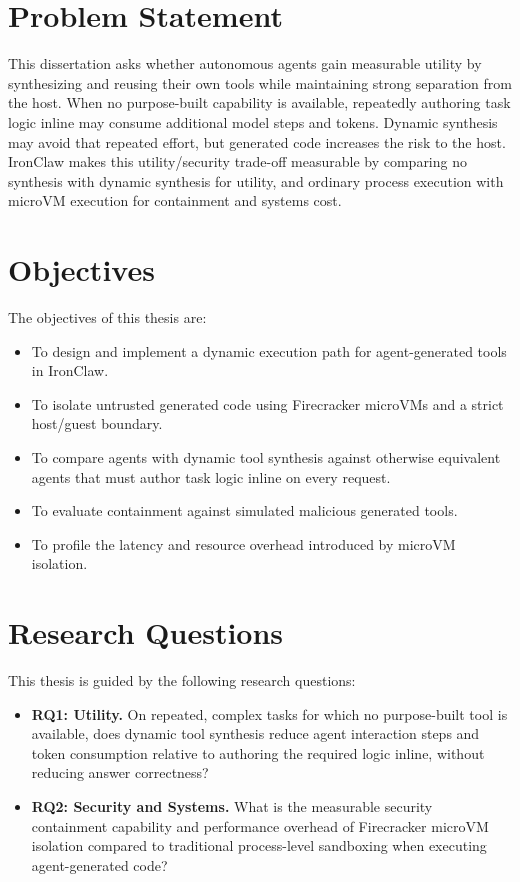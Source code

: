 \section{Problem Statement}
This dissertation asks whether autonomous agents gain measurable utility by
synthesizing and reusing their own tools while maintaining strong separation
from the host. When no purpose-built capability is available, repeatedly
authoring task logic inline may consume additional model steps and tokens.
Dynamic synthesis may avoid that repeated effort, but generated code increases
the risk to the host. IronClaw makes this utility/security trade-off measurable
by comparing no synthesis with dynamic synthesis for utility, and ordinary
process execution with microVM execution for containment and systems cost.

\section{Objectives}
The objectives of this thesis are:
\begin{itemize}
    \item To design and implement a dynamic execution path for agent-generated
    tools in IronClaw.
    \item To isolate untrusted generated code using Firecracker microVMs and a
    strict host/guest boundary.
    \item To compare agents with dynamic tool synthesis against otherwise
    equivalent agents that must author task logic inline on every request.
    \item To evaluate containment against simulated malicious generated tools.
    \item To profile the latency and resource overhead introduced by microVM
    isolation.
\end{itemize}

\section{Research Questions}
This thesis is guided by the following research questions:
\begin{itemize}
    \item \textbf{RQ1: Utility.} On repeated, complex tasks for which no
    purpose-built tool is available, does dynamic tool synthesis reduce agent
    interaction steps and token consumption relative to authoring the required
    logic inline, without reducing answer correctness?
    \item \textbf{RQ2: Security and Systems.} What is the measurable security
    containment capability and performance overhead of Firecracker microVM
    isolation compared to traditional process-level sandboxing when executing
    agent-generated code?
\end{itemize}

